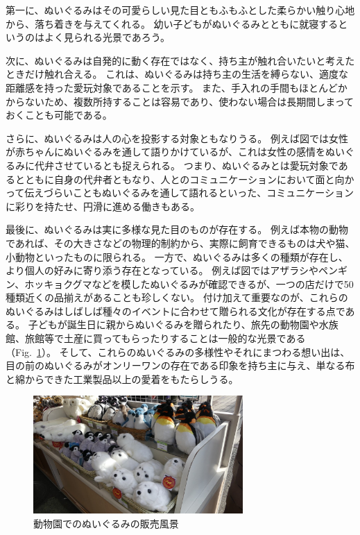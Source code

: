 \documentclass[uplatex,a4paper,12pt]{jsarticle}
\renewcommand{\figurename}{Fig.}
\newcommand{\figref}[1]{\figurename~\ref{#1}}
\begin{document}
第一に、ぬいぐるみはその可愛らしい見た目ともふもふとした柔らかい触り心地から、落ち着きを与えてくれる。
幼い子どもがぬいぐるみとともに就寝するというのはよく見られる光景であろう。

次に、ぬいぐるみは自発的に動く存在ではなく、持ち主が触れ合いたいと考えたときだけ触れ合える。
これは、ぬいぐるみは持ち主の生活を縛らない、適度な距離感を持った愛玩対象であることを示す。
また、手入れの手間もほとんどかからないため、複数所持することは容易であり、使わない場合は長期間しまっておくことも可能である。

さらに、ぬいぐるみは人の心を投影する対象ともなりうる。
例えば図では女性が赤ちゃんにぬいぐるみを通して語りかけているが、これは女性の感情をぬいぐるみに代弁させているとも捉えられる。
つまり、ぬいぐるみとは愛玩対象であるとともに自身の代弁者ともなり、人とのコミュニケーションにおいて面と向かって伝えづらいこともぬいぐるみを通して語れるといった、コミュニケーションに彩りを持たせ、円滑に進める働きもある。

最後に、ぬいぐるみは実に多様な見た目のものが存在する。
例えば本物の動物であれば、その大きさなどの物理的制約から、実際に飼育できるものは犬や猫、小動物といったものに限られる。
一方で、ぬいぐるみは多くの種類が存在し、より個人の好みに寄り添う存在となっている。
例えば図ではアザラシやペンギン、ホッキョクグマなどを模したぬいぐるみが確認できるが、一つの店だけで50種類近くの品揃えがあることも珍しくない。
付け加えて重要なのが、これらのぬいぐるみはしばしば種々のイベントに合わせて贈られる文化が存在する点である。
子どもが誕生日に親からぬいぐるみを贈られたり、旅先の動物園や水族館、旅館等で土産に買ってもらったりすることは一般的な光景である（\figref{fig:zoo}）。
そして、これらのぬいぐるみの多様性やそれにまつわる想い出は、目の前のぬいぐるみがオンリーワンの存在である印象を持ち主に与え、単なる布と綿からできた工業製品以上の愛着をもたらしうる。

\begin{figure}[htbp]
  \centering
  \includegraphics[width=8cm]{images/backgrounds/zoo.jpg}
  \caption{動物園でのぬいぐるみの販売風景}
  \label{fig:zoo}
\end{figure}
\end{document}

